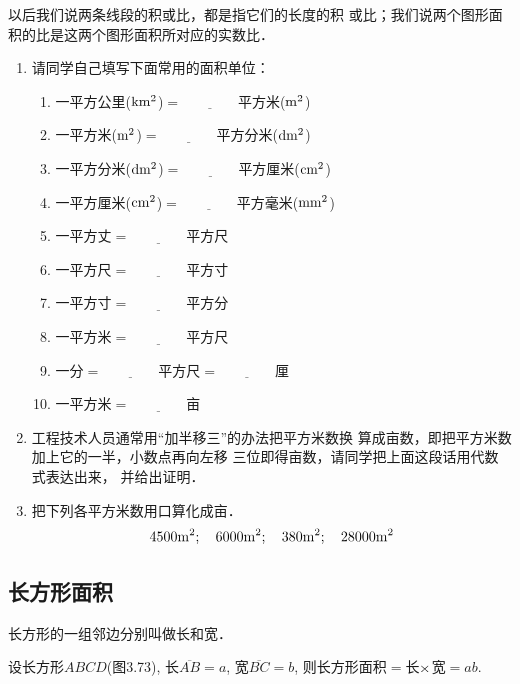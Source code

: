 以后我们说两条线段的积或比，都是指它们的长度的积
或比；我们说两个图形面积的比是这两个图形面积所对应的实数比．

\begin{ex}
\begin{enumerate}
    \item 请同学自己填写下面常用的面积单位：
\begin{enumerate}
\item     一平方公里($\rm km^2$)$=\underline{\qquad\qquad}$平方米($\rm m^2$)
\item     一平方米($\rm m^2$)$=\underline{\qquad\qquad}$平方分米($\rm dm^2$)
\item    一平方分米($\rm dm^2$)$=\underline{\qquad\qquad}$平方厘米($\rm cm^2$)
\item 一平方厘米($\rm cm^2$)$=\underline{\qquad\qquad}$平方毫米($\rm mm^2$)
\item 一平方丈$=\underline{\qquad\qquad}$平方尺
\item 一平方尺$=\underline{\qquad\qquad}$平方寸
\item 一平方寸$=\underline{\qquad\qquad}$平方分
\item 一平方米$=\underline{\qquad\qquad}$平方尺
\item 一分$=\underline{\qquad\qquad}$平方尺$=\underline{\qquad\qquad}$厘
\item 一平方米$=\underline{\qquad\qquad}$亩
\end{enumerate}

    \item 工程技术人员通常用“加半移三”的办法把平方米数换
    算成亩数，即把平方米数加上它的一半，小数点再向左移
    三位即得亩数，请同学把上面这段话用代数式表达出来，
    并给出证明．
    \item 把下列各平方米数用口算化成亩．
\[ 4500{\rm m^2};\quad     6000{\rm m^2};\quad     380{\rm m^2};
 \quad    28000{\rm m^2}\]
\end{enumerate}
\end{ex}

\subsection{长方形面积}
长方形的一组邻边分别叫做长和宽．

设长方形$ABCD$(图3.73), 长$\overline{AB}=a$, 宽$\overline{BC}=b$, 
则长方形面积$=$长$\times$宽$=ab$.

\begin{figure}[htp]
    \centering
{}
    \caption{}
\end{figure}


